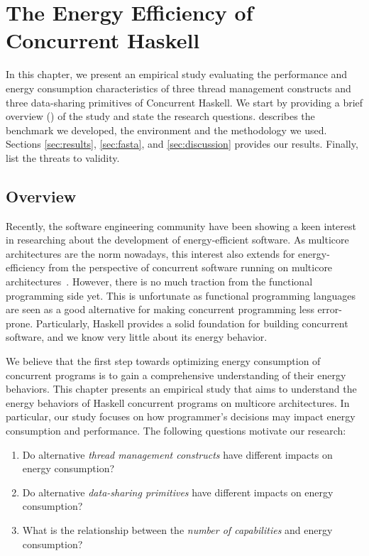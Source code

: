 \chapter{The Energy Efficiency of Concurrent Haskell}\label{chp:study}
In this chapter, we present an empirical study evaluating the performance and energy consumption characteristics of three thread management constructs and three data-sharing primitives of Concurrent Haskell. We start by providing a brief overview () of the study and state the research questions.  describes the benchmark we developed, the environment and the methodology we used. Sections \ref{sec:results}, \ref{sec:fasta}, and \ref{sec:discussion} provides our results. Finally,  list the threats to validity.

\section{Overview}\label{sec:overview}
Recently, the software engineering community have been showing a keen interest in researching about the development of energy-efficient software. As multicore architectures are the norm nowadays, this interest also extends for energy-efficiency from the perspective of concurrent software running on multicore architectures~\cite{trefethen:2013,ribic:2014, pinto:2014}. However, there is no much traction from the functional programming side yet. This is unfortunate as functional programming languages are seen as a good alternative for making concurrent programming less error-prone. %
Particularly, Haskell provides a solid foundation for building concurrent software, and we know very little about its energy behavior.

We believe that the first step towards optimizing energy consumption of concurrent programs is to gain a comprehensive understanding of their energy behaviors. This chapter presents an empirical study that aims to understand the energy behaviors of Haskell concurrent programs on multicore architectures. In particular, our study focuses on how programmer's decisions may impact energy consumption and performance. The following questions motivate our research:

\begin{enumerate}[label=\RQ{\arabic*}.]
  \item Do alternative \textit{thread management constructs} have different impacts on energy consumption?
  \item Do alternative \textit{data-sharing primitives} have different impacts on energy consumption?
  \item What is the relationship between the \textit{number of capabilities} and energy consumption?
\end{enumerate}

